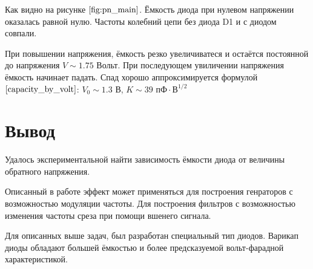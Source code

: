 \documentclass[a4paper, 12pt]{extarticle}
\begin{document}
Как видно на рисунке $\ref{fig:pn_main}$. Ёмкость диода при нулевом напряжении оказалась равной нулю.
Частоты колебний цепи без диода D1 и с диодом совпали.

При повышении напряжения, ёмкость резко увеличиватеся и остаётся постоянной до напряжения
$V \sim 1.75 \text{ Вольт}$. При последующем увиличении напряжения ёмкость начинает падать. 
Спад хорошо аппроксимируется формулой $\ref{capacity_by_volt}$:  $V_0 \sim 1.3 \text{ В}$,
$K \sim 39 \text{ пФ} \cdot \text{В}^{1/ 2}$

\section*{\textcolor{header}{Вывод}}

Удалось экспериментальной найти зависимость ёмкости диода от величины обратного напряжения.

Описанный в работе эффект может применяться для построения генраторов с возможностью модуляции частоты.
Для построения фильтров с возможностью изменения частоты среза при помощи вшенего сигнала.

Для описанных выше задач, был разработан специальный тип диодов. Варикап диоды обладают
большей ёмкостью и более предсказуемой вольт-фарадной характеристикой.
\end{document}
